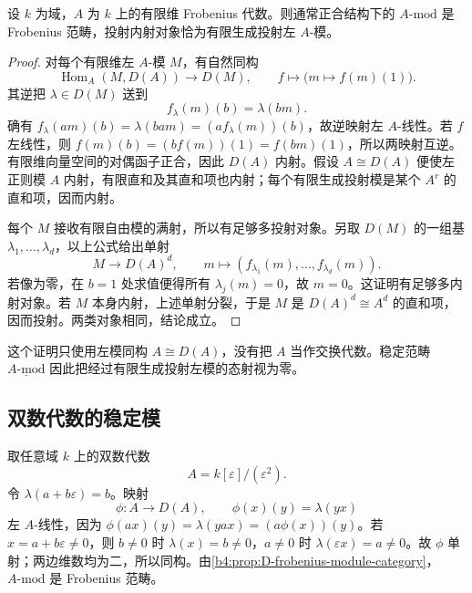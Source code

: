\begin{proposition}\label{b4:prop:D-frobenius-module-category}
	设 \(k\) 为域，\(A\) 为 \(k\) 上的有限维 Frobenius 代数。则通常正合结构下的 \(A\text{-}\mathrm{mod}\) 是 Frobenius 范畴，投射内射对象恰为有限生成投射左 \(A\)-模。
\end{proposition}
\begin{proof}
	对每个有限维左 \(A\)-模 \(M\)，有自然同构
	\[
		\operatorname{Hom}_A(M,D(A))\longrightarrow D(M), \qquad f\longmapsto\bigl(m\mapsto f(m)(1)\bigr).
	\]
	其逆把 \(\lambda\in D(M)\) 送到
	\[
		f_\lambda(m)(b)=\lambda(bm).
	\]
	确有 \(f_\lambda(am)(b)=\lambda(bam)=(a f_\lambda(m))(b)\)，故逆映射左 \(A\)-线性。若 \(f\) 左线性，则 \(f(m)(b)=(b f(m))(1)=f(bm)(1)\)，所以两映射互逆。有限维向量空间的对偶函子正合，因此 \(D(A)\) 内射。假设 \(A\cong D(A)\) 便使左正则模 \(A\) 内射，有限直和及其直和项也内射；每个有限生成投射模是某个 \(A^r\) 的直和项，因而内射。

	每个 \(M\) 接收有限自由模的满射，所以有足够多投射对象。另取 \(D(M)\) 的一组基 \(\lambda_1,\ldots,\lambda_d\)，以上公式给出单射
	\[
		M\longrightarrow D(A)^d, \qquad m\longmapsto(f_{\lambda_1}(m),\ldots,f_{\lambda_d}(m)).
	\]
	若像为零，在 \(b=1\) 处求值便得所有 \(\lambda_j(m)=0\)，故 \(m=0\)。这证明有足够多内射对象。若 \(M\) 本身内射，上述单射分裂，于是 \(M\) 是 \(D(A)^d\cong A^d\) 的直和项，因而投射。两类对象相同，结论成立。
\end{proof}

这个证明只使用左模同构 \(A\cong D(A)\)，没有把 \(A\) 当作交换代数。稳定范畴 \(\underline{A\text{-}\mathrm{mod}}\) 因此把经过有限生成投射左模的态射视为零。

\subsection{双数代数的稳定模}
\label{b4:subsec:D02:02}

取任意域 \(k\) 上的双数代数
\[
	A=k[\varepsilon]/(\varepsilon^2).
\]
令 \(\lambda(a+b\varepsilon)=b\)。映射
\[
	\phi:A\longrightarrow D(A),\qquad \phi(x)(y)=\lambda(yx)
\]
左 \(A\)-线性，因为 \(\phi(ax)(y)=\lambda(yax)=(a\phi(x))(y)\)。若 \(x=a+b\varepsilon\ne0\)，则 \(b\ne0\) 时 \(\lambda(x)=b\ne0\)，\(a\ne0\) 时 \(\lambda(\varepsilon x)=a\ne0\)。故 \(\phi\) 单射；两边维数均为二，所以同构。由\cref{b4:prop:D-frobenius-module-category}，\(A\text{-}\mathrm{mod}\) 是 Frobenius 范畴。

